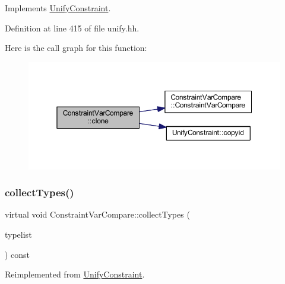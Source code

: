 Implements \mbox{\hyperlink{class_unify_constraint_a4f068343932637d355644bb21559aa12}{Unify\+Constraint}}.



Definition at line 415 of file unify.\+hh.

Here is the call graph for this function\+:
\nopagebreak
\begin{figure}[H]
\begin{center}
\leavevmode
\includegraphics[width=350pt]{class_constraint_var_compare_adc69772066381dd17190c552d5efe0d5_cgraph}
\end{center}
\end{figure}
\mbox{\label{class_constraint_var_compare_a8ffefd1d6865a0d95ef078fc085fbedc}} 
\subsubsection{\texorpdfstring{collectTypes()}{collectTypes()}}
{\footnotesize\ttfamily virtual void Constraint\+Var\+Compare\+::collect\+Types (\begin{DoxyParamCaption}\item[{vector$<$ \mbox{\hyperlink{class_unify_datatype}{Unify\+Datatype}} $>$ \&}]{typelist }\end{DoxyParamCaption}) const\hspace{0.3cm}{\ttfamily [virtual]}}



Reimplemented from \mbox{\hyperlink{class_unify_constraint_acb83b6bea3b21e13054e72ac9cfaba0f}{Unify\+Constraint}}.

\mbox{\label{class_constraint_var_compare_acdf5a965736247512e0b96ca53c13aa8}} 
